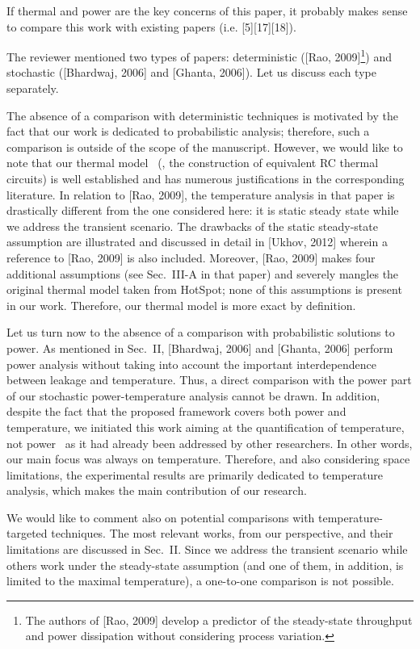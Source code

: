 \begin{reviewer}
If thermal and power are the key concerns of this paper, it probably makes sense to compare this work with existing papers (i.e. [5][17][18]).
\end{reviewer}
\begin{authors}
The reviewer mentioned two types of papers: deterministic ([Rao, 2009]\footnote{The authors of [Rao, 2009] develop a predictor of the steady-state throughput and power dissipation without considering process variation.}) and stochastic ([Bhardwaj, 2006] and [Ghanta, 2006]).
Let us discuss each type separately.

The absence of a comparison with deterministic techniques is motivated by the fact that our work is dedicated to probabilistic analysis; therefore, such a comparison is outside of the scope of the manuscript.
However, we would like to note that our thermal model \perse\ (\ie, the construction of equivalent RC thermal circuits) is well established and has numerous justifications in the corresponding literature.
In relation to [Rao, 2009], the temperature analysis in that paper is drastically different from the one considered here: it is static steady state while we address the transient scenario.
The drawbacks of the static steady-state assumption are illustrated and discussed in detail in [Ukhov, 2012] wherein a reference to [Rao, 2009] is also included.
Moreover, [Rao, 2009] makes four additional assumptions (see Sec.~III-A in that paper) and severely mangles the original thermal model taken from HotSpot; none of this assumptions is present in our work.
Therefore, our thermal model is more exact by definition.

Let us turn now to the absence of a comparison with probabilistic solutions to power.
As mentioned in Sec.~II, [Bhardwaj, 2006] and [Ghanta, 2006] perform power analysis without taking into account the important interdependence between leakage and temperature.
Thus, a direct comparison with the power part of our stochastic power-temperature analysis cannot be drawn.
In addition, despite the fact that the proposed framework covers both power and temperature, we initiated this work aiming at the quantification of temperature, not power \perse\ as it had already been addressed by other researchers.
In other words, our main focus was always on temperature.
Therefore, and also considering space limitations, the experimental results are primarily dedicated to temperature analysis, which makes the main contribution of our research.

We would like to comment also on potential comparisons with temperature-targeted techniques.
The most relevant works, from our perspective, and their limitations are discussed in Sec.~II.
Since we address the transient scenario while others work under the steady-state assumption (and one of them, in addition, is limited to the maximal temperature), a one-to-one comparison is not possible.

\begin{actions}
\end{actions}
\end{authors}
